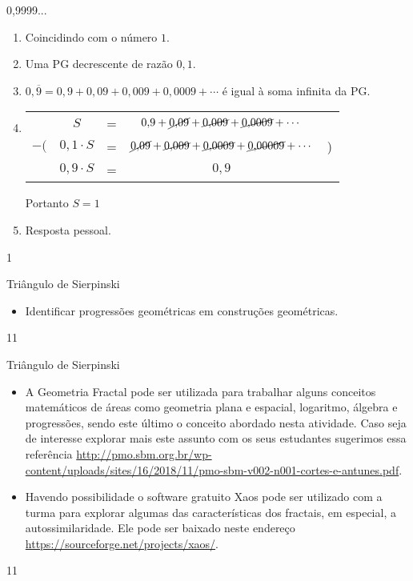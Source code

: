 \begin{answer}{0,9999...}
{
\begin{enumerate}
\item {} Coincidindo com o número $1$.
	
\item{} Uma PG decrescente de razão $0{,}1$.
	
\item{} $0,\overline{9}=0{,}9+ 0{,}09+0{,}009+0{,}0009+\cdots$ é igual à soma infinita da PG.

\item{} 
\begin{tabular}{ccccc}
\  & $S$ & = & $0{,}9+\cancel{0{,}09}+\cancel{0{,}009}+\cancel{0{,}0009}+\cdots$ & \ \\
$-($ & $0{,}1\cdot S$  & = & $\cancel{0{,}09}+\cancel{0{,}009}+\cancel{0{,}0009}+\cancel{0{,}00009}+\cdots$  & ) \\
\midrule
\  & $0{,}9\cdot S$ & = & $ 0{,}9 $ & \ \\
\end{tabular}

Portanto $S=1$

\item{} Resposta pessoal.		
\end{enumerate}
}{1}
\end{answer}
\begin{objectives}{Triângulo de Sierpinski}
{
\begin{itemize}
\item Identificar progressões geométricas em construções geométricas.


\end{itemize}
}{1}{1}
\end{objectives}
\begin{sugestions}{Triângulo de Sierpinski}
{
\begin{itemize}
\item A Geometria Fractal pode ser utilizada para trabalhar alguns conceitos matemáticos de áreas como geometria plana e espacial, logaritmo, álgebra e progressões, sendo este último o conceito abordado nesta atividade. Caso seja de interesse explorar mais este assunto com os seus estudantes sugerimos essa referência \url{http://pmo.sbm.org.br/wp-content/uploads/sites/16/2018/11/pmo-sbm-v002-n001-cortes-e-antunes.pdf}.

\item Havendo possibilidade o software gratuito Xaos pode ser utilizado com a turma para explorar algumas das características dos fractais, em especial, a autossimilaridade. Ele pode ser baixado neste endereço \url{https://sourceforge.net/projects/xaos/}.

\end{itemize}
}{1}{1}
\end{sugestions}
